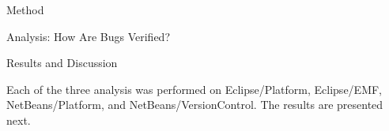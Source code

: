 \begin{section}{Method}
\begin{subsection}{Analysis: How Are Bugs Verified?}
	
	
\end{subsection}

\end{section}

\begin{section}{Results and Discussion} \label{sec:results}
	
	Each of the three analysis was performed on Eclipse/Platform, Eclipse/EMF, NetBeans/Platform, and NetBeans/VersionControl. The results are presented next.
	
% 	
% 	
	

\end{section}
